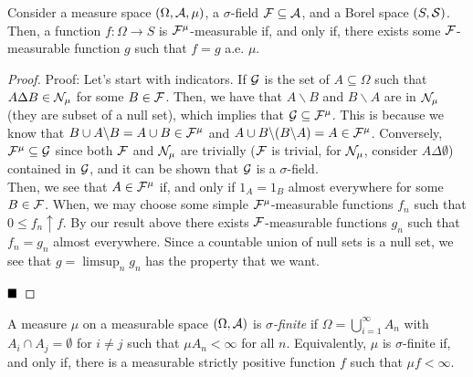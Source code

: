 
\begin{lemma}
    Consider a measure space $(\Omega, \cal{A}, \mu)$, a $\sigma$-field $\cal{F} \subseteq \cal{A}$, and a Borel space $(S, \cal{S})$. Then, a function $f : \Omega \to S$ is $\cal{F}^{\mu}$-measurable if, and only if, there exists some $\cal{F}$-measurable function $g$ such that $f = g$ a.e. $\mu$. 
\end{lemma}
\begin{proof}{Proof:}
    Let's start with indicators. If $\cal{G}$ is the set of $A \subseteq \Omega$ such that $A \Delta B \in \cal{N}_{\mu}$ for some $B \in \cal{F}$. Then, we have that $A \backslash B$ and $B \backslash A$ are in $\cal{N}_{\mu}$ (they are subset of a null set), which implies that $\cal{G} \subseteq \cal{F}^{\mu}$. This is because we know that $B \cup A \backslash B = A \cup B \in \cal{F}^{\mu}$ and $A \cup B \backslash (B \backslash A) = A \in \cal{F}^{\mu}$. Conversely, $\cal{F}^{\mu} \subseteq \cal{G}$ since both $\cal{F}$ and $\cal{N}_{\mu}$ are trivially ($\cal{F}$ is trivial, for $\cal{N}_{\mu}$, consider $A \Delta \emptyset$) contained in $\cal{G}$, and it can be shown that $\cal{G}$ is a $\sigma$-field. \\

    Then, we see that $A \in \cal{F}^{\mu}$ if, and only if $1_{A} = 1_{B}$ almost everywhere for some $B \in \cal{F}$. When, we may choose some simple $\cal{F}^{\mu}$-measurable functions $f_n$ such that $0 \leq f_n \uparrow f$. By our result above there exists $\cal{F}$-measurable functions $g_n$ such that $f_n = g_n$ almost everywhere. Since a countable union of null sets is a null set, we see that $g = \limsup_{n} g_n$ has the property that we want.

    $\qed$
\end{proof}

\begin{definition}
    A measure $\mu$ on a measurable space $(\Omega, \cal{A})$ is \emph{$\sigma$-finite} if $\Omega = \bigcup_{i = 1}^{\infty} A_n$ with $A_i \cap A_j = \emptyset$ for $i \ne j$ such that $\mu A_n < \infty$ for all $n$. Equivalently, $\mu$ is $\sigma$-finite if, and only if, there is a measurable strictly positive function $f$ such that $\mu f < \infty$. 
\end{definition}


